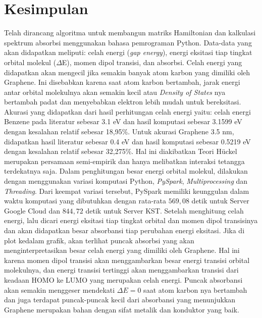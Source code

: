 \documentclass[12pt,a4paper]{report}
\begin{document}
\section{Kesimpulan}
	Telah dirancang algoritma untuk membangun matriks Hamiltonian dan kalkulasi spektrum absorbsi menggunakan bahasa pemrograman Python. Data-data yang akan didapatkan meliputi: celah energi (\textit{gap energy}), energi eksitasi tiap tingkat orbital molekul ($\Delta$E), momen dipol transisi, dan absorbsi. Celah energi yang didapatkan akan mengecil jika semakin banyak atom karbon yang dimiliki oleh Graphene. Ini disebabkan karena saat atom karbon bertambah, jarak energi antar orbital molekulnya akan semakin kecil atau \textit{Density of States} nya bertambah padat dan menyebabkan elektron lebih mudah untuk bereksitasi. Akurasi yang didapatkan dari hasil perhitungan celah energi yaitu: celah energi Benzene pada literatur sebesar 3.1 eV \cite{Masiak2017} dan hasil komputasi sebesar 3.1599 eV dengan kesalahan relatif sebesar 18,95\%. Untuk akurasi Graphene 3.5 nm, didapatkan hasil literatur sebesar 0.4 eV dan hasil komputasi sebesar 0.5219 eV dengan kesalahan relatif sebesar 32,275\%. Hal ini diakibatkan Teori Hückel merupakan persamaan semi-empirik dan hanya melibatkan interaksi tetangga terdekatnya saja. Dalam penghitungan besar energi orbital molekul, dilakukan dengan menggunakan variasi komputasi Python, \textit{PySpark}, \textit{Multiprocessing} dan \textit{Threading}. Dari keempat variasi tersebut, PySpark memiliki keunggulan dalam waktu komputasi yang dibutuhkan dengan rata-rata $569,08$ detik untuk Server Google Cloud dan $844,72$ detik untuk Server KST. Setelah menghitung celah energi, lalu dicari energi eksitasi tiap tingkat orbital dan momen dipol transisinya dan akan didapatkan besar absorbansi tiap perubahan energi eksitasi. Jika di plot kedalam grafik, akan terlihat puncak absorbsi yang akan menginterpretasikan besar celah energi yang dimiliki oleh Graphene. Hal ini karena momen dipol transisi akan menggambarkan besar energi transisi orbital molekulnya, dan energi transisi tertinggi akan menggambarkan transisi dari keadaan HOMO ke LUMO yang merupakan celah energi. Puncak absorbansi akan semakin menggeser mendekati $\Delta E = 0$ saat atom karbon nya bertambah dan juga terdapat puncak-puncak kecil dari absorbansi yang menunjukkan Graphene merupakan bahan dengan sifat metalik dan konduktor yang baik.
\end{document}
